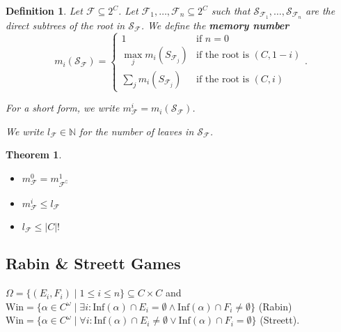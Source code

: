 \documentclass{article}
\newtheorem{theorem}{Theorem}
\newtheorem{definition}{Definition}
\begin{document}
\begin{definition}
	Let $\mathcal{F} \subseteq 2^C$. Let $\mathcal{F}_1, \dots, \mathcal{F}_n \subseteq 2^C$ such that $\mathcal{S}_{\mathcal{F}_1}, \dots, \mathcal{S}_{\mathcal{F}_n}$ are the direct subtrees of the root in $\mathcal{S}_\mathcal{F}$. We define the \textbf{memory number} 
	$$m_i(\mathcal{S}_\mathcal{F}) = \begin{cases}
		1 & \text{if } n = 0 \\
		\max_j m_i(S_{\mathcal{F}_j}) & \text{if the root is } (C, 1-i) \\
		\sum_j m_i(S_{\mathcal{F}_j}) & \text{if the root is } (C, i) 
	\end{cases}.$$
	
	For a short form, we write $m^i_\mathcal{F} = m_i(\mathcal{S}_\mathcal{F})$.
	
	We write $l_\mathcal{F} \in \mathbb{N}$ for the number of leaves in $\mathcal{S}_\mathcal{F}$.
\end{definition}

\begin{theorem}
\begin{itemize}
	\item $m^0_\mathcal{F} = m^1_{\mathcal{F}^\complement}$
	\item $m^i_\mathcal{F} \leq l_\mathcal{F}$
	\item $l_\mathcal{F} \leq |C|!$
\end{itemize}
\end{theorem}

\vspace{1.5cm}
\subsection{Rabin \& Streett Games}
$\Omega = \{(E_i, F_i) \mid 1 \leq i \leq n\} \subseteq C \times C$ and \\
$\text{Win} = \{ \alpha \in C^\omega \mid \exists i: \text{Inf}(\alpha) \cap E_i = \emptyset \land \text{Inf}(\alpha) \cap F_i \neq \emptyset \}$ (Rabin) \\
$\text{Win} = \{ \alpha \in C^\omega \mid \forall i: \text{Inf}(\alpha) \cap E_i \neq \emptyset \lor \text{Inf}(\alpha) \cap F_i = \emptyset \}$ (Streett).
\end{document}
